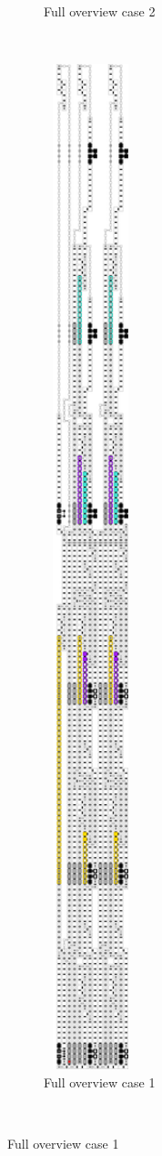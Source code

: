 \begin{figure}[H]
\begin{subfigure}[t]{0.3\textwidth}
        \caption{\label{fig:full_overview_case2_colored} Full overview case 2}
    \end{subfigure}%
    ~
    \begin{subfigure}[t]{0.3\textwidth}
        \centering
        \includegraphics[width=0.3\textwidth]{full_overview_case1_colored}
        \caption{\label{fig:full_overview_case1_colored} Full overview case 1}
    \end{subfigure}%
    ~
\end{figure}